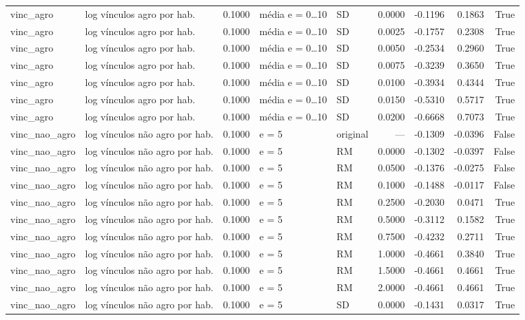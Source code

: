 \begin{table}
{\begin{tabular}{llrllrrrr}
vinc\_agro & log vínculos agro por hab. & 0.1000 & média e = 0…10 & SD & 0.0000 & -0.1196 & 0.1863 & True \\
vinc\_agro & log vínculos agro por hab. & 0.1000 & média e = 0…10 & SD & 0.0025 & -0.1757 & 0.2308 & True \\
vinc\_agro & log vínculos agro por hab. & 0.1000 & média e = 0…10 & SD & 0.0050 & -0.2534 & 0.2960 & True \\
vinc\_agro & log vínculos agro por hab. & 0.1000 & média e = 0…10 & SD & 0.0075 & -0.3239 & 0.3650 & True \\
vinc\_agro & log vínculos agro por hab. & 0.1000 & média e = 0…10 & SD & 0.0100 & -0.3934 & 0.4344 & True \\
vinc\_agro & log vínculos agro por hab. & 0.1000 & média e = 0…10 & SD & 0.0150 & -0.5310 & 0.5717 & True \\
vinc\_agro & log vínculos agro por hab. & 0.1000 & média e = 0…10 & SD & 0.0200 & -0.6668 & 0.7073 & True \\
vinc\_nao\_agro & log vínculos não agro por hab. & 0.1000 & e = 5 & original & — & -0.1309 & -0.0396 & False \\
vinc\_nao\_agro & log vínculos não agro por hab. & 0.1000 & e = 5 & RM & 0.0000 & -0.1302 & -0.0397 & False \\
vinc\_nao\_agro & log vínculos não agro por hab. & 0.1000 & e = 5 & RM & 0.0500 & -0.1376 & -0.0275 & False \\
vinc\_nao\_agro & log vínculos não agro por hab. & 0.1000 & e = 5 & RM & 0.1000 & -0.1488 & -0.0117 & False \\
vinc\_nao\_agro & log vínculos não agro por hab. & 0.1000 & e = 5 & RM & 0.2500 & -0.2030 & 0.0471 & True \\
vinc\_nao\_agro & log vínculos não agro por hab. & 0.1000 & e = 5 & RM & 0.5000 & -0.3112 & 0.1582 & True \\
vinc\_nao\_agro & log vínculos não agro por hab. & 0.1000 & e = 5 & RM & 0.7500 & -0.4232 & 0.2711 & True \\
vinc\_nao\_agro & log vínculos não agro por hab. & 0.1000 & e = 5 & RM & 1.0000 & -0.4661 & 0.3840 & True \\
vinc\_nao\_agro & log vínculos não agro por hab. & 0.1000 & e = 5 & RM & 1.5000 & -0.4661 & 0.4661 & True \\
vinc\_nao\_agro & log vínculos não agro por hab. & 0.1000 & e = 5 & RM & 2.0000 & -0.4661 & 0.4661 & True \\
vinc\_nao\_agro & log vínculos não agro por hab. & 0.1000 & e = 5 & SD & 0.0000 & -0.1431 & 0.0317 & True \\

\end{tabular}}
\end{table}
